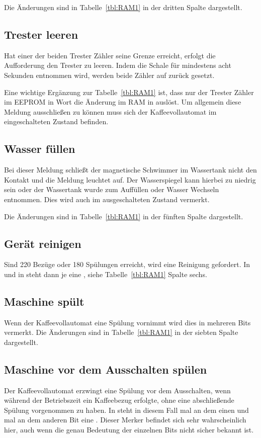 Die Änderungen sind in Tabelle~\ref{tbl:RAM1} in der dritten Spalte dargestellt.

\subsection{Trester leeren}
Hat einer der beiden Trester Zähler seine Grenze erreicht, erfolgt die Aufforderung den Trester zu leeren.
Indem die Schale für mindestens acht Sekunden entnommen wird, werden beide Zähler auf  zurück gesetzt.

Eine wichtige Ergänzung zur Tabelle~\ref{tbl:RAM1} ist, dass nur der Trester Zähler im \ac{EEPROM} in Wort  die Änderung im \ac{RAM} in  auslöst.
Um allgemein diese Meldung ausschließen zu können muss sich der Kaffeevollautomat im eingeschalteten Zustand befinden.

\subsection{Wasser füllen} %
Bei dieser Meldung schließt der magnetische Schwimmer im Wassertank nicht den Kontakt und die Meldung leuchtet auf.
Der Wasserspiegel kann hierbei zu niedrig sein oder der Wassertank wurde zum Auffüllen oder Wasser Wechseln entnommen.
Dies wird auch im ausgeschalteten Zustand vermerkt.

Die Änderungen sind in Tabelle~\ref{tbl:RAM1} in der fünften Spalte dargestellt.

\subsection{Gerät reinigen}
Sind 220 Bezüge oder 180 Spülungen erreicht, wird eine Reinigung gefordert.
In  und in  steht dann je eine , siehe Tabelle~\ref{tbl:RAM1} Spalte sechs.

\subsection{Maschine spült}
Wenn der Kaffeevollautomat eine Spülung vornimmt wird dies in mehreren Bits vermerkt.
Die Änderungen sind in Tabelle~\ref{tbl:RAM1} in der siebten Spalte dargestellt.

\subsection{Maschine vor dem Ausschalten spülen}
Der Kaffeevollautomat erzwingt eine Spülung vor dem Ausschalten, wenn während der Betriebszeit ein Kaffeebezug erfolgte, ohne eine abschließende Spülung vorgenommen zu haben.
In  steht in diesem Fall mal an dem einen und mal an dem anderen Bit eine .
Dieser Merker befindet sich sehr wahrscheinlich hier, auch wenn die genau Bedeutung der einzelnen Bits nicht sicher bekannt ist.

